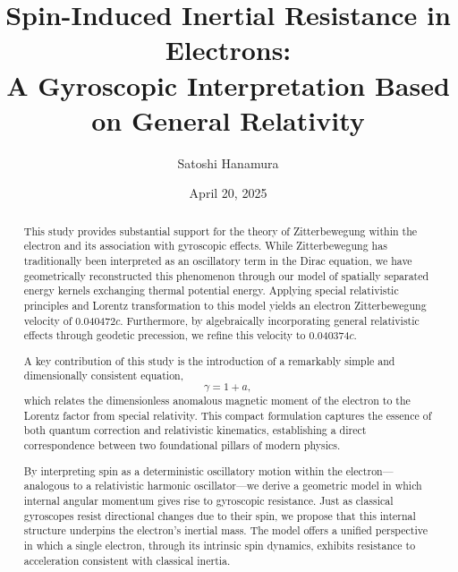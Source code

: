 \documentclass[%
 reprint,
 amsmath,amssymb,
 aps,
]{revtex4-1}
\numberwithin{equation}{section}%
\begin{document}


\title{Spin-Induced Inertial Resistance in Electrons:\\A Gyroscopic Interpretation Based on General Relativity}

\author{Satoshi Hanamura}
\date{April 20, 2025}

\begin{abstract}
This study provides substantial support for the theory of Zitterbewegung within the electron and its association with gyroscopic effects. While Zitterbewegung has traditionally been interpreted as an oscillatory term in the Dirac equation, we have geometrically reconstructed this phenomenon through our model of spatially separated energy kernels exchanging thermal potential energy. Applying special relativistic principles and Lorentz transformation to this model yields an electron Zitterbewegung velocity of 0.040472$c$. Furthermore, by algebraically incorporating general relativistic effects through geodetic precession, we refine this velocity to 0.040374$c$.

A key contribution of this study is the introduction of a remarkably simple and dimensionally consistent equation,
\[
\gamma = 1 + a,
\]
which relates the dimensionless anomalous magnetic moment of the electron to the Lorentz factor from special relativity. This compact formulation captures the essence of both quantum correction and relativistic kinematics, establishing a direct correspondence between two foundational pillars of modern physics.

By interpreting spin as a deterministic oscillatory motion within the electron—analogous to a relativistic harmonic oscillator—we derive a geometric model in which internal angular momentum gives rise to gyroscopic resistance. Just as classical gyroscopes resist directional changes due to their spin, we propose that this internal structure underpins the electron’s inertial mass. The model offers a unified perspective in which a single electron, through its intrinsic spin dynamics, exhibits resistance to acceleration consistent with classical inertia.
\end{abstract}
\end{document}
